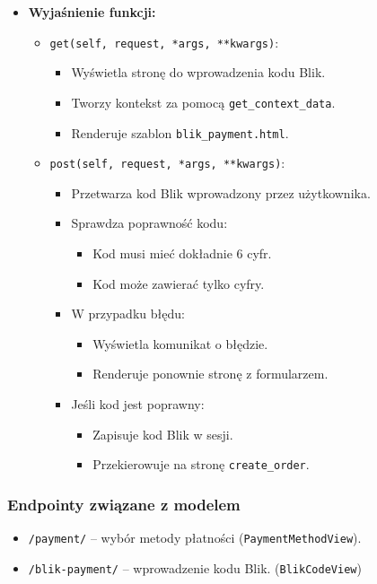 \documentclass[12pt,a4paper,oneside]{article}
\theoremstyle{definition}
\numberwithin{equation}{section}
\begin{document}
\begin{itemize}
    \item \textbf{Wyjaśnienie funkcji:}
    \begin{itemize}
        \item \texttt{get(self, request, *args, **kwargs)}:
        \begin{itemize}
            \item Wyświetla stronę do wprowadzenia kodu Blik.
            \item Tworzy kontekst za pomocą \texttt{get\_context\_data}.
            \item Renderuje szablon \texttt{blik\_payment.html}.
        \end{itemize}
        \item \texttt{post(self, request, *args, **kwargs)}:
        \begin{itemize}
            \item Przetwarza kod Blik wprowadzony przez użytkownika.
            \item Sprawdza poprawność kodu:
            \begin{itemize}
                \item Kod musi mieć dokładnie 6 cyfr.
                \item Kod może zawierać tylko cyfry.
            \end{itemize}
            \item W przypadku błędu:
            \begin{itemize}
                \item Wyświetla komunikat o błędzie.
                \item Renderuje ponownie stronę z formularzem.
            \end{itemize}
            \item Jeśli kod jest poprawny:
            \begin{itemize}
                \item Zapisuje kod Blik w sesji.
                \item Przekierowuje na stronę \texttt{create\_order}.
            \end{itemize}
        \end{itemize}
    \end{itemize}
\end{itemize}


\subsubsection{Endpointy związane z modelem}
\begin{itemize}
    \item \texttt{/payment/} – wybór metody płatności (\texttt{PaymentMethodView}).
    \item \texttt{/blik-payment/} – wprowadzenie kodu Blik. (\texttt{BlikCodeView})
\end{itemize}
\end{document}
